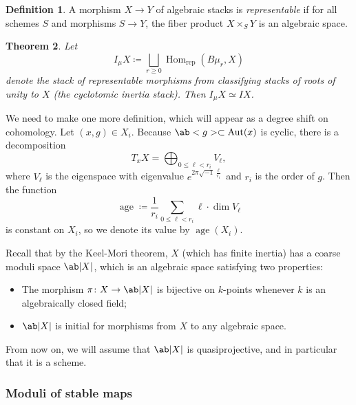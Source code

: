 \documentclass[leqno, openany]{memoir}
\newtheorem{thm}{Theorem}[section]
\theoremstyle{definition}
\newtheorem{defn}[thm]{Definition}
\theoremstyle{remark}
\theoremstyle{plain}
\theoremstyle{definition}
\theoremstyle{remark}
\newcommand{\mr}[1]{\mathrm{#1}}
\newcommand{\on}[1]{\operatorname{#1}}
\DeclareMathOperator{\Hom}{Hom}
\DeclareMathOperator{\Aut}{Aut}
\begin{document}
\begin{defn}
    A morphism $X \to Y$ of algebraic stacks is \textit{representable} if for all schemes $S$ and morphisms $S \to Y$, the fiber product $X \times_S Y$ is an algebraic space.
\end{defn}

\begin{thm}
    Let
    \[ I_{\mu} X \coloneqq \bigsqcup_{r \geq 0} \Hom_{\mr{rep}}(B\mu_r, X) \]
    denote the stack of representable morphisms from classifying stacks of roots of unity to $X$ (the \textit{cyclotomic inertia stack}). Then $I_{\mu} X \simeq IX$.
\end{thm}

We need to make one more definition, which will appear as a degree shift on cohomology. Let $(x,g) \in X_i$. Because $\ab<g> \subset \Aut(x)$ is cyclic, there is a decomposition
\[ T_x X = \bigoplus_{0 \leq \ell < r_i} V_{\ell}, \]
where $V_{\ell}$ is the eigenspace with eigenvalue $e^{2\pi \sqrt{-1} \frac{\ell}{r_i}}$ and $r_i$ is the order of $g$. Then the function
\[ \on{age} \coloneqq \frac{1}{r_i} \sum_{0 \leq \ell < r_i} \ell \cdot \dim V_{\ell} \]
is constant on $X_i$, so we denote its value by $\on{age}(X_i)$.

Recall that by the Keel-Mori theorem, $X$ (which has finite inertia) has a coarse moduli space $\ab|X|$, which is an algebraic space satisfying two properties:
\begin{itemize}
    \item The morphism $\pi \colon X \to \ab|X|$ is bijective on $k$-points whenever $k$ is an algebraically closed field;
    \item $\ab|X|$ is initial for morphisms from $X$ to any algebraic space.
\end{itemize}
From now on, we will assume that $\ab|X|$ is quasiprojective, and in particular that it is a scheme.

\subsubsection{Moduli of stable maps}%
\label{ssub:Moduli of stable maps}
\end{document}
